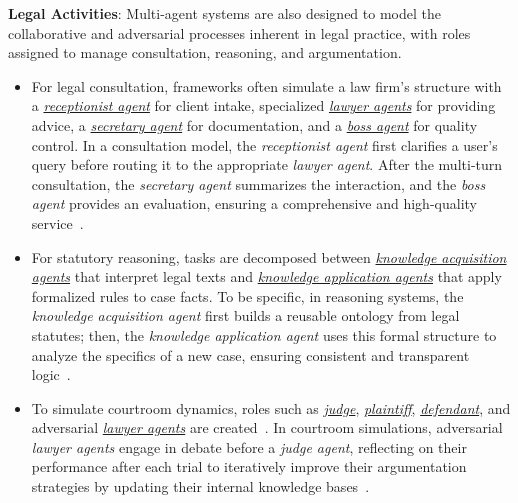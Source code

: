 \textbf{Legal Activities}:
Multi-agent systems are also designed to model the collaborative and adversarial processes inherent in legal practice, with roles assigned to manage consultation, reasoning, and argumentation.
\begin{itemize}
    \item For legal consultation, frameworks often simulate a law firm's structure with a \underline{\emph{receptionist agent}} for client intake, specialized \underline{\emph{lawyer agents}} for providing advice, a \underline{\emph{secretary agent}} for documentation, and a \underline{\emph{boss agent}} for quality control. In a consultation model, the \emph{receptionist agent} first clarifies a user's query before routing it to the appropriate \emph{lawyer agent}. After the multi-turn consultation, the \emph{secretary agent} summarizes the interaction, and the \emph{boss agent} provides an evaluation, ensuring a comprehensive and high-quality service~\cite{sun2024lawluo}.
    \item For statutory reasoning, tasks are decomposed between \underline{\emph{knowledge acquisition agents}} that interpret legal texts and \underline{\emph{knowledge application agents}} that apply formalized rules to case facts. To be specific, in reasoning systems, the \emph{knowledge acquisition agent} first builds a reusable ontology from legal statutes; then, the \emph{knowledge application agent} uses this formal structure to analyze the specifics of a new case, ensuring consistent and transparent logic~\cite{sadowski2025verifiable}.
    \item To simulate courtroom dynamics, roles such as \underline{\emph{judge}}, \underline{\emph{plaintiff}}, \underline{\emph{defendant}}, and adversarial \underline{\emph{lawyer agents}} are created~\cite{chen2024agentcourt}. In courtroom simulations, adversarial \emph{lawyer agents} engage in debate before a \emph{judge agent}, reflecting on their performance after each trial to iteratively improve their argumentation strategies by updating their internal knowledge bases~\cite{chen2024agentcourt}.
\end{itemize}

